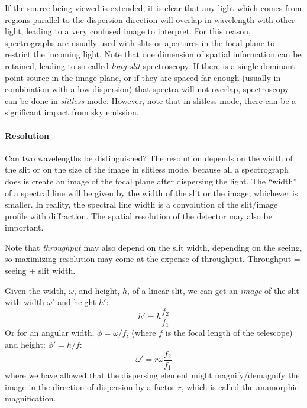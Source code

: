 \documentclass[12pt]{article}
\newcommand{\mynotes}[1]{\textcolor{myBlue}{#1}}
\begin{document}
If the source being viewed is extended, it is clear that any light which comes
from regions parallel to the dispersion direction will overlap in wavelength
with other light, leading to a very confused image to interpret. For this
reason, spectrographs are usually used with slits or apertures in the focal
plane to restrict the incoming light. Note that one dimension of spatial
information can be retained, leading to so-called \textit{long-slit}
spectroscopy. If there is a single dominant point source in the image plane, or
if they are spaced far enough (usually in combination with a low dispersion)
that spectra will not overlap, spectroscopy can be done in \textit{slitless}
mode. However, note that in slitless mode, there can be a significant impact
from sky emission.

\paragraph{Resolution}
\mynotes{Can two wavelengths be distinguished?}
The resolution depends on the width of the slit or on
the size of the image in slitless mode, because all a spectrograph does is
create an image of the focal plane after dispersing the light. The ``width'' of
a spectral line will be given by the width of the slit or the image, whichever
is smaller. In reality, the spectral line width is a convolution of the
slit/image profile with diffraction. The spatial resolution of the detector may
also be important.

Note that \textit{throughput} may also depend on the slit width, depending on
the seeing, so maximizing resolution may come at the expense of
throughput. Throughput = seeing + slit width.

Given the width, $\omega$, and height, $h$, of a linear slit,
we can get an \emph{image} of the slit with width $\omega'$ and
height $h'$:
\[
    h' = h\frac{f_{2}}{f_{1}}
    \]
Or for an angular width, $\phi = \omega/f$,
(where $f$ is the focal length of the telescope) and height:
$\phi' = h/f$:
$$ \omega' = r\omega\frac{f_{2}}{f_{1}} $$
where we have allowed that the dispersing element might
magnify/demagnify the image in the direction of dispersion by a factor
$r$, which is called the anamorphic magnification.
\end{document}
